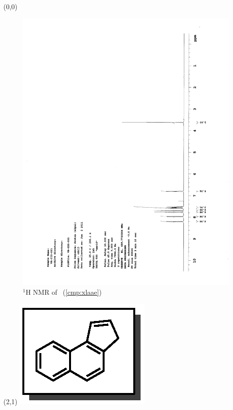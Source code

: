 \begin{textblock}{20}(0,0)
\begin{figure}[htb]
\caption{$^1$H NMR of \CMPxlaae\ (\ref{cmp:xlaae})}
\includegraphics[scale=0.75, trim = 0mm 0mm 0mm 5mm,
clip]{chp_asymmetric/images/nmr/xlaaeH}
\vspace{-100pt}
\end{figure}
\end{textblock}
\begin{textblock}{1}(2,1)
\includegraphics[scale=0.8, angle=90]{chp_asymmetric/images/xlaae}
\end{textblock}
